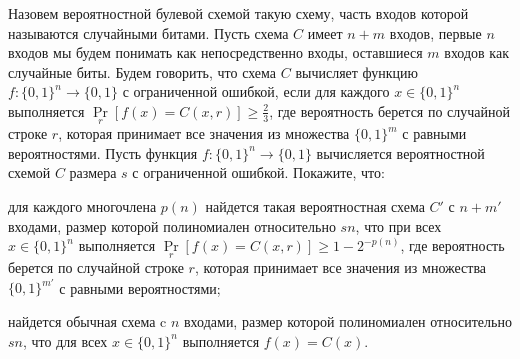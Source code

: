 Назовем вероятностной булевой схемой такую схему, часть входов которой называются случайными битами. Пусть схема $C$ имеет $n
+ m$ входов, первые $n$ входов мы будем понимать как непосредственно входы, оставшиеся $m$ входов как случайные биты. Будем
говорить, что схема $C$ вычисляет функцию $f: \{0, 1\}^n \to \{0, 1\}$ с ограниченной ошибкой, если для каждого $x \in
\{0,1\}^n$ выполняется $\Pr\limits_{r}[f(x) = C(x, r)] \ge \frac{2}{3}$, где вероятность берется по случайной строке $r$, которая
принимает все значения из множества $\{0,1\}^m$ с равными вероятностями. Пусть функция $f:\{0, 1\}^n \to \{0, 1\}$
вычисляется вероятностной схемой $C$ размера $s$ с ограниченной ошибкой. Покажите, что:
\begin{enumcyr}
    \item для каждого многочлена $p(n)$ найдется такая вероятностная схема $C'$ с $n + m'$ входами, размер которой
	    полиномиален относительно $s n$, что при всех $x \in \{0, 1\}^n$ выполняется $\Pr\limits_{r}[f(x) = C(x, r)] \ge 1 -
        2^{-p(n)}$, где вероятность берется по случайной строке $r$, которая принимает все значения из множества $\{0,
        1\}^{m'}$ с равными вероятностями;
    \item найдется обычная схема c $n$ входами, размер которой полиномиален относительно $s n$, что для всех $x \in \{0,
	    1\}^n$ выполняется $f(x) = C(x)$.
\end{enumcyr}
